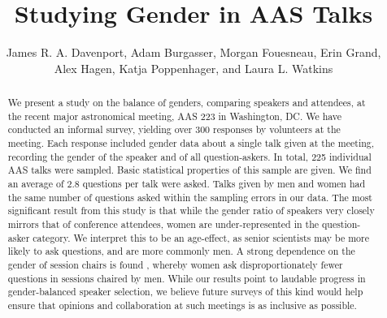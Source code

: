 \documentclass[iop]{emulateapj}
\begin{document}
\title{Studying Gender in AAS Talks}
\author{
	James R. A. Davenport,
	Adam Burgasser,
	Morgan Fouesneau,
	Erin Grand,\\
	Alex Hagen,
	Katja Poppenhager,
	and Laura L. Watkins
	}



\begin{abstract}
We present a study on the balance of genders, comparing speakers and attendees, at the recent major astronomical meeting, AAS 223 in Washington, DC. We have conducted an informal survey, yielding over 300 responses by volunteers at the meeting. Each response included gender data about a single talk given at the meeting, recording the gender of the speaker and of all question-askers. In total, 225 individual AAS talks were sampled. Basic statistical properties of this sample are given. We find an average of 2.8 questions per talk were asked. Talks given by men and women had the same number of questions asked within the sampling errors in our data. The most significant result from this study is that while the gender ratio of speakers very closely mirrors that of conference attendees, women are under-represented in the question-asker category.  We interpret this to be an age-effect, as senior scientists may be more likely to ask questions, and are more commonly men. A strong dependence on the gender of session chairs is found , whereby women ask disproportionately fewer questions in sessions chaired by men. While our results point to laudable progress in gender-balanced speaker selection, we believe future surveys of this kind would help ensure that opinions and collaboration at such meetings is as inclusive as possible.
\end{abstract}
\end{document}
